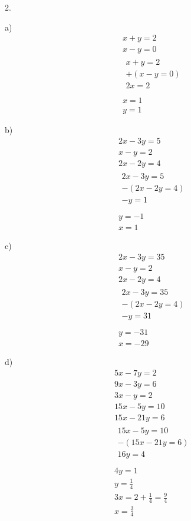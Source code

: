 \documentclass[]{report}
\begin{document}
2.

a) 
\begin{align*}
x + y = 2 \tag{1}\\
x - y = 0 \tag{2} \\
\begin{split}
x + y = 2\\
+(x - y =0)\\
\hline
2x = 2\\
\end{split}\\
x = 1\\
y = 1 
\end{align*}

b)
\begin{align*}
2x - 3y = 5\\
x - y = 2 \\
2x-2y = 4\\
\begin{split}
2x - 3y = 5\\
-(2x - 2y = 4)\\
\hline
-y = 1 \\
\end{split}\\
y = -1\\
x = 1
\end{align*}

c)
\begin{align*}
2x - 3y = 35\\
x - y = 2\\
2x - 2y = 4\\
\begin{split}
2x - 3y = 35\\
-(2x - 2y = 4)\\
\hline
-y = 31 \\
\end{split}\\
y = -31\\
x = -29
\end{align*}


d) 
\begin{align*}
5x - 7y = 2\\
9x - 3y = 6\\
3x - y = 2 \\
15x - 5y = 10\\
15x - 21y = 6\\
\begin{split}
15x - 5y = 10\\
-(15x - 21y = 6)\\
\hline
16y = 4 \\
\end{split}\\
4y=1\\
y=\frac{1}{4}\\
3x = 2 + \frac{1}{4} = \frac{9}{4}\\
x = \frac{3}{4}
\end{align*}
\end{document}
